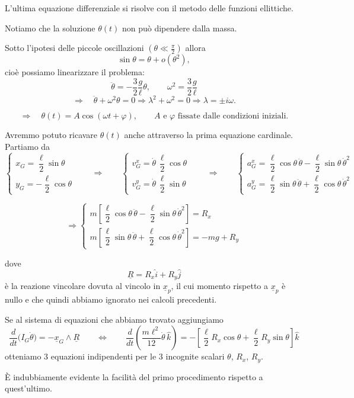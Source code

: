 \begin{example}{}
L'ultima equazione differenziale si risolve con il metodo delle funzioni
ellittiche.

Notiamo che la soluzione \(\theta(t)\) non può dipendere dalla massa.

Sotto l'ipotesi delle piccole oscillazioni \(\left(\theta\ll \frac{\pi}{2}\right)\)
allora
\[
\sin\theta=\theta+o(\theta^2),
\]
cioè possiamo linearizzare il problema:
\[
\ddot{\theta}
=
-\frac{3}{2}\frac{g}{\ell}\theta,
\qquad
\omega^2=\frac{3}{2}\frac{g}{\ell}
\]
\[
\Rightarrow\quad
\ddot{\theta}+\omega^2\theta=0
\Rightarrow
\lambda^2+\omega^2=0
\Rightarrow
\lambda=\pm i\omega.
\]

\[
\Rightarrow\quad
\theta(t)=A\cos(\omega t+\varphi),
\qquad
A \text{ e } \varphi \text{ fissate dalle condizioni iniziali.}
\]


\begin{oss}{}
Avremmo potuto ricavare \(\theta(t)\) anche attraverso la prima equazione
cardinale. Partiamo da
\[
\begin{cases}
x_G=\dfrac{\ell}{2}\sin\theta\\[4pt]
y_G=-\dfrac{\ell}{2}\cos\theta
\end{cases}
\qquad \Rightarrow \qquad
\begin{cases}
v_G^x=\dot{\theta}\,\dfrac{\ell}{2}\cos\theta\\[4pt]
v_G^y=\dot{\theta}\,\dfrac{\ell}{2}\sin\theta
\end{cases}
\qquad \Rightarrow \qquad
\begin{cases}
a_G^x=\dfrac{\ell}{2}\cos\theta\,\ddot{\theta}-\dfrac{\ell}{2}\sin\theta\,\dot{\theta}^2\\[4pt]
a_G^y=\dfrac{\ell}{2}\sin\theta\,\ddot{\theta}+\dfrac{\ell}{2}\cos\theta\,\dot{\theta}^2
\end{cases}
\]

\[
\Rightarrow
\begin{cases}
m\left[\dfrac{\ell}{2}\cos\theta\,\ddot{\theta}-\dfrac{\ell}{2}\sin\theta\,\dot{\theta}^2\right]=R_x\\[8pt]
m\left[\dfrac{\ell}{2}\sin\theta\,\ddot{\theta}+\dfrac{\ell}{2}\cos\theta\,\dot{\theta}^2\right]=-mg+R_y
\end{cases}
\]

dove
\[
\underline{R}=R_x\hat{i}+R_y\hat{j}
\]
è la reazione vincolare dovuta al vincolo in \(\underline{x}_p\), il cui momento
rispetto a \(\underline{x}_p\) è nullo e che quindi abbiamo ignorato nei calcoli
precedenti.

Se al sistema di equazioni che abbiamo trovato aggiungiamo
\[
\frac{d}{dt}\bigl(I_G\dot{\theta}\bigr)=-\underline{x}_G\wedge \underline{R}
\qquad \Longleftrightarrow \qquad
\frac{d}{dt}\left(\frac{m\ell^2}{12}\dot{\theta}\,\hat{k}\right)
=
-\left[\frac{\ell}{2}R_x\cos\theta+\frac{\ell}{2}R_y\sin\theta\right]\hat{k}
\]
otteniamo \(3\) equazioni indipendenti per le \(3\) incognite scalari
\(\theta\), \(R_x\), \(R_y\).

È indubbiamente evidente la facilità del primo procedimento rispetto a
quest'ultimo.
\end{oss}

\end{example}


